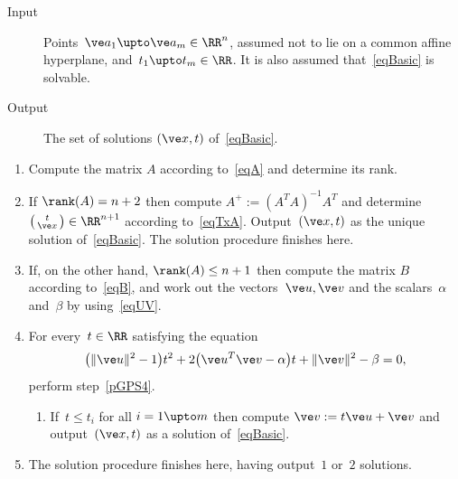 \documentclass[reqno]{amsart}
\begin{document}
\begin{procedure} \label{pGPS}%
  \mbox{}
  \begin{description}
    \item[Input] Points~$\ve a_1 \upto \ve a_m \in \RR^n$, assumed not to lie on a common affine hyperplane, and~$t_1 \upto t_m \in \RR$. It is also assumed that~\eqref{eqBasic} is solvable.
    \item[Output] The set of solutions $(\ve x,t)$ of~\eqref{eqBasic}.
  \end{description}
  \begin{enumerate}[label=(\arabic*)]
    \item Compute the matrix $A$ according to~\eqref{eqA} and determine its rank.
    \item If $\rank(A) = n+2$ then compute $A^+ := (A^T A)^{-1} A^T$ and determine $\left(\begin{smallmatrix} t \\ \ve x\end{smallmatrix}\right) \in \RR^{n+1}$ according to~\eqref{eqTxA}. Output~$(\ve x,t)$ as the unique solution of~\eqref{eqBasic}. The solution procedure finishes here.
    \item If, on the other hand, $\rank(A) \le n+1$ then compute the matrix $B$ according to~\eqref{eqB}, and work out the vectors~$\ve u,\ve v$ and the scalars~$\alpha$ and~$\beta$ by using~\eqref{eqUV}.
    \item For every~$t \in \RR$ satisfying the equation
    \[
    \bigl(\lVert\ve u\rVert^2-1\bigr) t^2 + 2 \bigl(\ve u^T \ve v-\alpha\bigr) t + \lVert\ve v\rVert^2 - \beta = 0,
    \]
    perform step~\ref{pGPS4}.
    \begin{enumerate}[label=(\arabic*)]
    \setcounter{enumii}{\value{enumi}}
      \item \label{pGPS4} If~$t \le t_i$ for all $i = 1 \upto m$ then compute $\ve v := t \ve u + \ve v$ and output~$(\ve x,t)$ as a solution of~\eqref{eqBasic}.
    \end{enumerate}
    \setcounter{enumi}{\value{enumii}}
    \item The solution procedure finishes here, having output~$1$ or~$2$ solutions.
  \end{enumerate}
\end{procedure}
\end{document}
